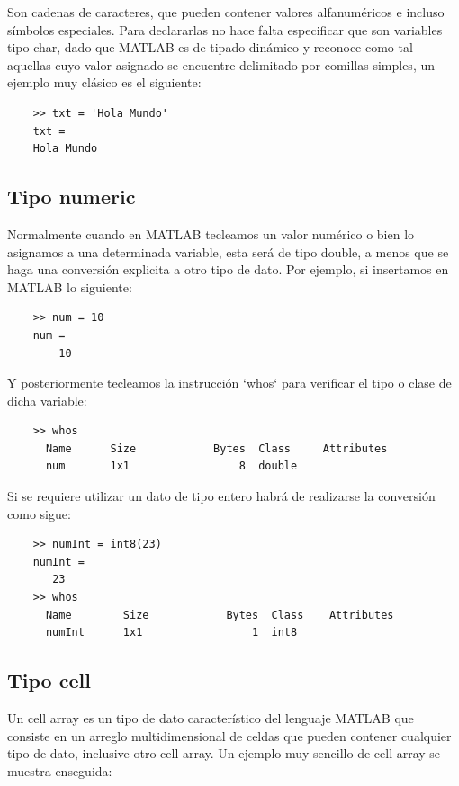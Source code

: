Son cadenas de caracteres, que pueden contener valores alfanuméricos e incluso símbolos especiales. 
Para declararlas no hace falta especificar que son variables tipo char, dado que MATLAB es de tipado 
dinámico y reconoce como tal aquellas cuyo valor asignado se encuentre delimitado por comillas simples, 
un ejemplo muy clásico es el siguiente:

\begin{verbatim}
	>> txt = 'Hola Mundo'
	txt =
	Hola Mundo
\end{verbatim}


\subsection{Tipo numeric}

Normalmente cuando en MATLAB tecleamos un valor numérico o bien lo asignamos a una determinada variable, 
esta será de tipo double, a menos que se haga una conversión explicita a otro tipo de dato. Por ejemplo, 
si insertamos en MATLAB lo siguiente:

\begin{verbatim}
	>> num = 10
	num =
	    10
\end{verbatim}

Y posteriormente tecleamos la instrucción `whos` para verificar el tipo o clase de dicha variable:

\begin{verbatim}
	>> whos
	  Name      Size            Bytes  Class     Attributes
	  num       1x1                 8  double   
\end{verbatim}

Si se requiere utilizar un dato de tipo entero habrá de realizarse la conversión como sigue:

\begin{verbatim}
	>> numInt = int8(23)
	numInt =
	   23
	>> whos
	  Name        Size            Bytes  Class    Attributes
	  numInt      1x1                 1  int8               
\end{verbatim}

\subsection{Tipo cell}

Un cell array es un tipo de dato característico del lenguaje MATLAB que consiste en un arreglo 
multidimensional de celdas que pueden contener cualquier tipo de dato, inclusive otro cell array. 
Un ejemplo muy sencillo de cell array se muestra enseguida:

